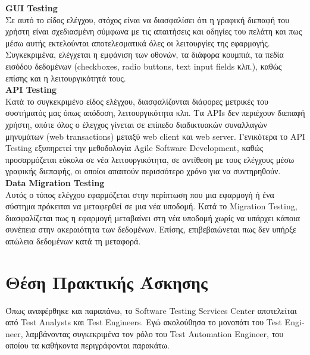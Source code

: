 \textlatin{\textbf{GUI Testing}}\\
Σε αυτό το είδος ελέγχου, στόχος είναι να διασφαλίσει ότι η γραφική διεπαφή του χρήστη είναι σχεδιασμένη σύμφωνα με τις απαιτήσεις και οδηγίες του πελάτη και πως μέσω αυτής εκτελούνται αποτελεσματικά όλες οι λειτουργίες της εφαρμογής. Συγκεκριμένα, ελέγχεται η εμφάνιση των οθονών, τα διάφορα κουμπιά, τα πεδία εισόδου δεδομένων (\textlatin{checkboxes, radio buttons, text input fields} κλπ.), καθώς επίσης και η λειτουργικότητά τους.\\

\textlatin{\textbf{API Testing}}\\
Κατά το συγκεκριμένο είδος ελέγχου, διασφαλίζονται διάφορες μετρικές του συστήματός μας όπως απόδοση, λειτουργικότητα κλπ. Τα \textlatin{APIs} δεν περιέχουν διεπαφή χρήστη, οπότε όλος ο έλεγχος γίνεται σε επίπεδο διαδικτυακών συναλλαγών μηνυμάτων (\textlatin{web transactions}) μεταξύ \textlatin{web client} και \textlatin{web server}. Γενικότερα το \textlatin{API Testing} εξυπηρετεί την μεθοδολογία \textlatin{Agile Software Development}, καθώς προσαρμόζεται εύκολα σε νέα λειτουργικότητα, σε αντίθεση με τους ελέγχους μέσω γραφικής διεπαφής, οι οποίοι απαιτούν περισσότερο χρόνο για να συντηρηθούν.\\

\textlatin{\textbf{Data Migration Testing}}\\
Αυτός ο τύπος ελέγχου εφαρμόζεται στην περίπτωση που μια εφαρμογή ή ένα σύστημα πρόκειται να μεταφερθεί σε μια νέα υποδομή. Κατά το \textlatin{Migration Testing}, διασφαλίζεται πως η εφαρμογή μεταβαίνει στη νέα υποδομή χωρίς να υπάρχει κάποια συνέπεια στην ακεραιότητα των δεδομένων. Επίσης, επιβεβαιώνεται πως δεν υπήρξε απώλεια δεδομένων κατά τη μεταφορά.\\

\section*{Θέση Πρακτικής Άσκησης}
Όπως αναφέρθηκε και παραπάνω, το \textlatin{Software Testing Services Center} αποτελείται από \textlatin{Test Analysts} και \textlatin{Test Engineers}. Εγώ ακολούθησα το μονοπάτι του \textlatin{Test Engineer}, λαμβάνοντας συγκεκριμένα τον ρόλο του \textlatin{Test Automation Engineer}, του οποίου τα καθήκοντα περιγράφονται παρακάτω.\\

